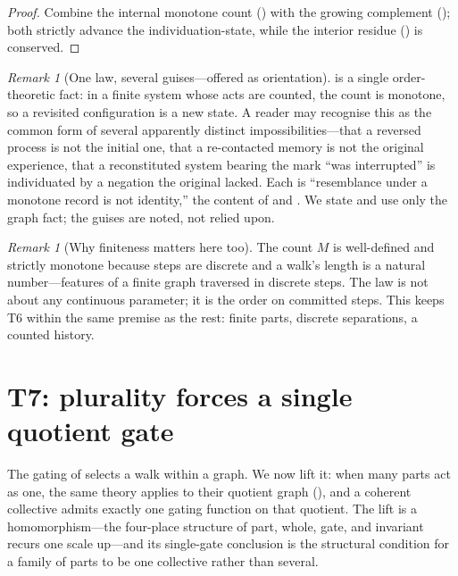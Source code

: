 \documentclass[11pt,a4paper]{article}
\theoremstyle{thmstyle}
\theoremstyle{definition}
\theoremstyle{remark}
\newtheorem{remark}[theorem]{Remark}
\newcommand{\rec}{M}                      %
\begin{document}
\begin{proof}
Combine the internal monotone count () with the growing
complement (); both strictly advance the
individuation-state, while the interior residue () is conserved.
\end{proof}

\begin{remark}[One law, several guises---offered as orientation]
\label{rem:onelaw}
 is a single order-theoretic fact: in a finite system whose
acts are counted, the count is monotone, so a revisited configuration is a new
state. A reader may recognise this as the common form of several apparently
distinct impossibilities---that a reversed process is not the initial one, that a
re-contacted memory is not the original experience, that a reconstituted system
bearing the mark ``was interrupted'' is individuated by a negation the original
lacked. Each is ``resemblance under a monotone record is not identity,'' the
content of  and . We state and use only
the graph fact; the guises are noted, not relied upon.
\end{remark}

\begin{remark}[Why finiteness matters here too]
\label{rem:nonreturn-finite}
The count $\rec$ is well-defined and strictly monotone because steps are
discrete and a walk's length is a natural number---features of a finite graph
traversed in discrete steps. The law is not about any continuous parameter; it is
the order on committed steps. This keeps T6 within the same premise as the rest:
finite parts, discrete separations, a counted history.
\end{remark}


\section{T7: plurality forces a single quotient gate}
\label{sec:quotient}

The gating of  selects a walk within a graph. We now lift it:
when many parts act as one, the same theory applies to their quotient graph
(), and a coherent collective admits exactly one gating
function on that quotient. The lift is a homomorphism---the four-place structure
of part, whole, gate, and invariant recurs one scale up---and its single-gate
conclusion is the structural condition for a family of parts to be one
collective rather than several.
\end{document}
